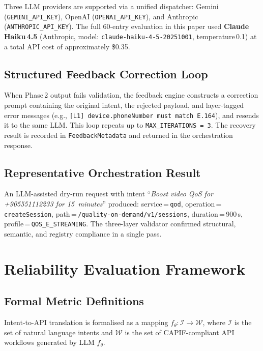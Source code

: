 \documentclass[conference]{IEEEtran}
\begin{document}
Three LLM providers are supported via a unified dispatcher:
Gemini (\texttt{GEMINI\_API\_KEY}), OpenAI (\texttt{OPENAI\_API\_KEY}),
and Anthropic (\texttt{ANTHROPIC\_API\_KEY}).
The full 60-entry evaluation in this paper used
\textbf{Claude Haiku\,4.5} (Anthropic, model:
\texttt{claude-haiku-4-5-20251001}, temperature\,0.1) at a total API
cost of approximately \$0.35.

\subsection{Structured Feedback Correction Loop}

When Phase\,2 output fails validation, the feedback engine constructs
a correction prompt containing the original intent, the rejected payload,
and layer-tagged error messages (e.g., \texttt{[L1] device.phoneNumber
must match E.164}), and resends it to the same LLM. This loop repeats
up to \texttt{MAX\_ITERATIONS\,=\,3}. The recovery result is recorded
in \texttt{FeedbackMetadata} and returned in the orchestration response.

\subsection{Representative Orchestration Result}

An LLM-assisted dry-run request with intent
``\textit{Boost video QoS for +905551112233 for 15~minutes}''
produced:
service\,=\,\texttt{qod},
operation\,=\,\texttt{createSession},
path\,=\,\texttt{/quality-on-demand/v1/sessions},
duration\,=\,900\,s,
profile\,=\,\texttt{QOS\_E\_STREAMING}.
The three-layer validator confirmed structural, semantic, and registry
compliance in a single pass.

\section{Reliability Evaluation Framework}

\subsection{Formal Metric Definitions}

Intent-to-API translation is formalised as a mapping
$f_\theta : \mathcal{I} \rightarrow \mathcal{W}$,
where $\mathcal{I}$ is the set of natural language intents and
$\mathcal{W}$ is the set of CAPIF-compliant API workflows generated
by LLM $f_\theta$.
\end{document}
